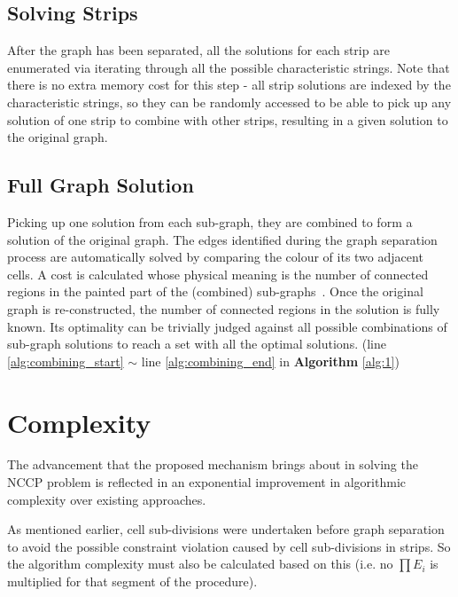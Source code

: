 \documentclass[journal]{IEEEtran}
\begin{document}
\subsection{Solving Strips}
After the graph has been separated, all the solutions for each strip are enumerated via iterating through all the possible characteristic strings. 
Note that there is no extra memory cost for this step - all strip solutions are indexed by the characteristic strings, so they can be randomly accessed 
to be able to pick up any solution of one strip to combine with other strips, resulting in a given solution to the original graph. 

\subsection{Full Graph Solution}
Picking up one solution from each sub-graph, they are combined to form a solution of the original graph. 
The edges identified during the graph separation process are automatically solved by comparing the colour of its two adjacent cells. 
A cost is calculated whose physical meaning is the number of connected regions in the painted part of the (combined) sub-graphs~\cite{Yang2020Cellular}. 
Once the original graph is re-constructed, the number of connected regions in the solution is fully known. Its optimality can be trivially judged against all possible combinations of sub-graph solutions to reach a set with all the optimal solutions. (line \ref{alg:combining_start} $\sim$ line \ref{alg:combining_end} in \textbf{Algorithm} \ref{alg:1})

\section{Complexity}
\label{section_complexity}
The advancement that the proposed mechanism brings about in solving the NCCP problem is reflected in an exponential improvement in algorithmic complexity over existing approaches.

As mentioned earlier, cell sub-divisions were undertaken before graph separation to avoid the possible  constraint violation caused by cell sub-divisions in strips. So the algorithm complexity must also be calculated based on this (i.e. no $\prod E_i$ is multiplied for that segment of the procedure).
\end{document}
